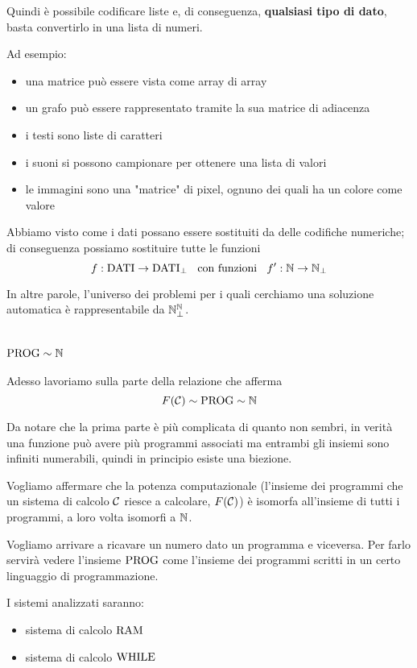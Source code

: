Quindi è possibile codificare liste e, di conseguenza, \textbf{qualsiasi tipo di dato}, basta convertirlo in una lista di numeri. 

Ad esempio:
\begin{itemize}
	\item una matrice può essere vista come array di array
	
    \item un grafo può essere rappresentato tramite la sua matrice di adiacenza
	
    \item i testi sono liste di caratteri
	
    \item i suoni si possono campionare per ottenere una lista di valori
	
    \item le immagini sono una "matrice" di pixel, ognuno dei quali ha un colore come valore
\end{itemize}

Abbiamo visto come i dati possano essere sostituiti da delle codifiche numeriche; di conseguenza possiamo sostituire tutte le funzioni
$$ f: \text{DATI} \rightarrow \text{DATI}_{\bot} \;\; \text{ con funzioni } \;\; f': \mathbb{N} \rightarrow \mathbb{N}_\bot $$

In altre parole, l'universo dei problemi per i quali cerchiamo una soluzione automatica è rappresentabile da $\mathbb{N}_\bot^{\mathbb{N}}$.

\section{$\text{PROG} \sim \mathbb{N}$}

Adesso lavoriamo sulla parte della relazione che afferma 
$$ F(\mathcal{C}) \sim \text{PROG} \sim \mathbb{N} $$

Da notare che la prima parte è più complicata di quanto non sembri, in verità una funzione può avere più programmi associati ma entrambi gli insiemi sono infiniti numerabili, quindi in principio esiste una biezione.

Vogliamo affermare che la potenza computazionale (l'insieme dei programmi che un sistema di calcolo $\mathcal{C}$ riesce a calcolare, $F(\mathcal{C})$) è isomorfa all'insieme di tutti i programmi, a loro volta isomorfi a $\mathbb{N}$. 

Vogliamo arrivare a ricavare un numero dato un programma e viceversa. Per farlo servirà vedere l'insieme $\text{PROG}$ come l'insieme dei programmi scritti in un certo linguaggio di programmazione.

I sistemi analizzati saranno: 
\begin{itemize}
	\item sistema di calcolo $\text{RAM}$
    
	\item sistema di calcolo $\text{WHILE}$
\end{itemize}

